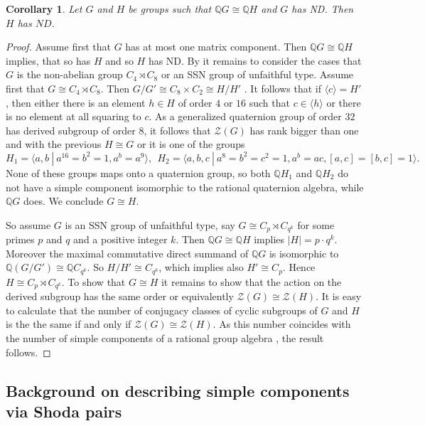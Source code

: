 \documentclass[a4paper,10pt]{amsart}
\newtheorem{corollary}[lemma]{Corollary}
\theoremstyle{definition}
\theoremstyle{remark}
\newcommand{\ZZ}{\mathcal{Z}}
\begin{document}
\begin{corollary}\label{coro ND determined by QG}
Let $G$ and $H$ be groups such that $\mathbb{Q}G \cong \mathbb{Q}H$ and $G$ has ND. Then $H$ has $ND$.
\end{corollary} 
\begin{proof}
Assume first that $G$ has at most one matrix component. Then $\mathbb{Q}G \cong \mathbb{Q}H$ implies, that so has $H$ and so $H$ has ND. By  it remains to consider the cases that $G$ is the non-abelian group $C_4 \rtimes C_8$ or an SSN group of unfaithful type. Assume first that $G \cong C_4 \rtimes C_8$. Then $G/G' \cong C_8 \times C_2 \cong H/H'$ \cite[Theorem 2.8]{AngelAngel}. It follows that if $\langle c \rangle = H'$, then either there is an element $h \in H$ of order $4$ or $16$ such that $c \in \langle h \rangle$ or there is no element at all squaring to $c$. As a generalized quaternion group of order $32$ has derived subgroup of order $8$, it follows that $\ZZ(G)$ has rank bigger than one and with the previous $H \cong G$ or it is one of the groups
\[H_1 = \langle a,b \ | \ a^{16} = b^2 =1, a^b = a^9 \rangle, \ \ H_2 = \langle a,b,c \ | \ a^8=b^2=c^2 = 1, a^b = ac, [a,c]=[b,c]=1 \rangle.\]
None of these groups maps onto a quaternion group, so both $\mathbb{Q}H_1$ and $\mathbb{Q}H_2$ do not have a simple component isomorphic to the rational quaternion algebra, while $\mathbb{Q}G$ does. We conclude $G \cong H$.

So assume $G$ is an SSN group of unfaithful type, say $G \cong C_p \rtimes C_{q^k}$ for some primes $p$ and $q$ and a positive integer $k$. Then $\mathbb{Q}G \cong \mathbb{Q}H$ implies $|H| = p\cdot q^k$. Moreover the maximal commutative direct summand of $\mathbb{Q}G$ is isomorphic to $\mathbb{Q}(G/G') \cong \mathbb{Q}C_{q^k}$. So $H/H' \cong C_{q^k}$, which implies also $H' \cong C_p$. Hence $H \cong C_p \rtimes  C_{q^k}$. To show that $G \cong H$ it remains to show that the action on the derived subgroup has the same order or equivalently $\ZZ(G) \cong \ZZ(H)$. It is easy to calculate that the number of conjugacy classes of cyclic subgroups of $G$ and $H$ is the the same if and only if $\ZZ(G) \cong \ZZ(H)$. As this number coincides with the number of simple components of a rational group algebra \cite[Corollary 7.1.12]{GRG1}, the result follows.
\end{proof}


\subsection{Background on describing simple components via Shoda pairs}\label{prelim for ND section}
\end{document}
